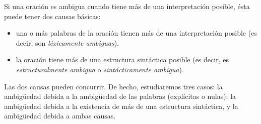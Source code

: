 Si una oración es ambigua cuando tiene más de una interpretación posible, ésta puede tener dos causas básicas: \begin{itemize} \item una o más palabras de la oración tienen más de una interpretación posible (es decir, son \emph{léxicamente ambiguas}). \item la oración tiene más de una estructura sintáctica posible (es decir, es \emph{estructuralmente ambigua} o \emph{sintácticamente ambigua}). \end{itemize} Las dos causas pueden concurrir. De hecho, estudiaremos tres casos: la ambigüedad debida a la ambigüedad de las palabras (explícitas o nulas); la ambigüedad debida a la existencia de más de una estructura sintáctica, y la ambigüedad debida a ambas causas. 

